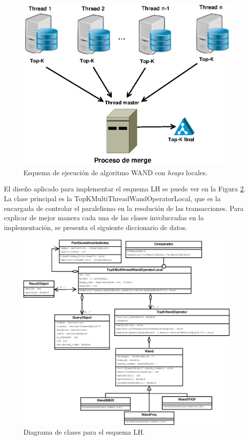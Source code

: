 \begin{figure}[tp]
\centering
\includegraphics[scale=.75]{images/wand_heaps_locales.eps}
\caption{Esquema de ejecución de algoritmo WAND con \textit{heaps} locales.}
\label{fig:wand-heap-local}
\end{figure}

El diseño aplicado para implementar el esquema LH se puede ver en la Figura \ref{fig:TopKMultiThreadWandOperatorLocal}. La clase principal es la TopKMultiThreadWandOperatorLocal, que es la encargada de controlar el paralelismo en la resolución de las transacciones. Para explicar de mejor manera cada una de las clases involucradas en la implementación, se presenta el siguiente diccionario de datos.

\begin{figure}[tp]
\centering
\includegraphics[scale=.75]{images/TopKMultiThreadWandOperatorLocal.eps}
\caption{Diagrama de clases para el esquema LH.}
\label{fig:TopKMultiThreadWandOperatorLocal}
\end{figure}

